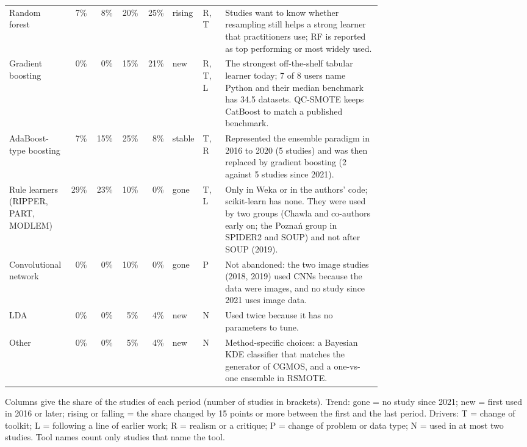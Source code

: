 \begin{table}[p]
\begin{tabular}{@{}p{0.16\linewidth}rrrrp{0.07\linewidth}p{0.06\linewidth}p{0.42\linewidth}@{}}
    Random forest & 7\% & 8\% & 20\% & 25\% & rising & R, T & Studies want to know whether resampling still helps a strong learner that practitioners use; RF is reported as top performing or most widely used.\\
    Gradient boosting & 0\% & 0\% & 15\% & 21\% & new & R, T, L & The strongest off-the-shelf tabular learner today; 7 of 8 users name Python and their median benchmark has 34.5 datasets. QC-SMOTE keeps CatBoost to match a published benchmark.\\
    AdaBoost-type boosting & 7\% & 15\% & 25\% & 8\% & stable & T, R & Represented the ensemble paradigm in 2016 to 2020 (5 studies) and was then replaced by gradient boosting (2 against 5 studies since 2021).\\
    Rule learners (RIPPER, PART, MODLEM) & 29\% & 23\% & 10\% & 0\% & gone & T, L & Only in Weka or in the authors' code; scikit-learn has none. They were used by two groups (Chawla and co-authors early on; the Poznań group in SPIDER2 and SOUP) and not after SOUP (2019).\\
    Convolutional network & 0\% & 0\% & 10\% & 0\% & gone & P & Not abandoned: the two image studies (2018, 2019) used CNNs because the data were images, and no study since 2021 uses image data.\\
    LDA & 0\% & 0\% & 5\% & 4\% & new & N & Used twice because it has no parameters to tune.\\
    Other & 0\% & 0\% & 5\% & 4\% & new & N & Method-specific choices: a Bayesian KDE classifier that matches the generator of CGMOS, and a one-vs-one ensemble in RSMOTE.\\
    \bottomrule
  \end{tabular}
  \par\smallskip\raggedright\scriptsize Columns give the share of the studies of each period (number of studies in brackets). Trend: gone = no study since 2021; new = first used in 2016 or later; rising or falling = the share changed by 15 points or more between the first and the last period. Drivers: T = change of toolkit; L = following a line of earlier work; R = realism or a critique; P = change of problem or data type; N = used in at most two studies. Tool names count only studies that name the tool.
\end{table}
